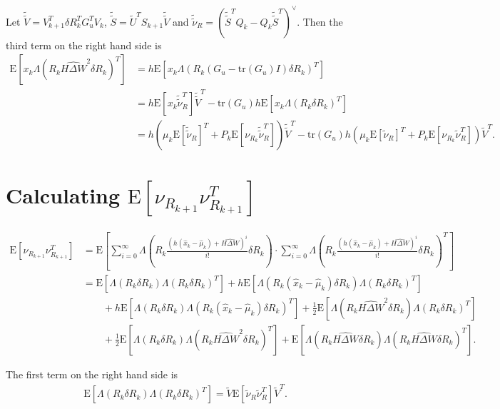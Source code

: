 \documentclass[10pt]{article}
\newcommand{\tr}[1]{\ensuremath{\mathrm{tr}\left( #1 \right)}}
\newcommand{\expect}[1]{\ensuremath{\mathrm{E}\left[ #1 \right]}}
\begin{document}
\noindent Let $\tilde{\tilde{V}} = V_{k+1}^T\delta R_k^TG_u^TV_k$, $\tilde{\tilde{S}} = \tilde{U}^TS_{k+1}\tilde{\tilde{V}}$ and $\tilde{\tilde{\nu}}_R = (\tilde{\tilde{S}}^TQ_k-Q_k\tilde{\tilde{S}}^T)^\vee$.
Then the third term on the right hand side is
\begin{align*}
	\expect{x_k\Lambda(R_k\widehat{H\Delta W}^2\delta R_k)^T} &= h\expect{x_k\Lambda(R_k(G_u-\tr{G_u}I)\delta R_k)^T} \\
	&= h\expect{x_k\tilde{\tilde{\nu}}_R^T}\tilde{\tilde{V}}^T - \tr{G_u}h\expect{x_k\Lambda(R_k\delta R_k)^T} \\
	&= h\left(\mu_k\expect{\tilde{\tilde{\nu}}_R}^T + P_k\expect{\nu_{R_k}\tilde{\tilde{\nu}}_R^T}\right)\tilde{\tilde{V}}^T - \tr{G_u}h\left(\mu_k\expect{\tilde{\nu}_R}^T + P_k\expect{\nu_{R_k}\tilde{\nu}_R^T}\right)\tilde{V}^T.
\end{align*}

\section{Calculating $\expect{\nu_{R_{k+1}}\nu_{R_{k+1}}^T}$}

\begin{align*}
	\expect{\nu_{R_{k+1}}\nu_{R_{k+1}}^T} &= \expect{\sum_{i=0}^\infty \Lambda\left(R_k \frac{\left(h(\hat{x}_k-\hat{\mu}_k) + \widehat{H\Delta W}\right)^i}{i!}\delta R_k\right) \cdot \sum_{i=0}^\infty \Lambda\left(R_k \frac{\left(h(\hat{x}_k-\hat{\mu}_k) + \widehat{H\Delta W}\right)^i}{i!}\delta R_k\right)^T} \\
	&= \expect{\Lambda(R_k\delta R_k)\Lambda(R_k\delta R_k)^T} + h\expect{\Lambda(R_k(\hat{x}_k-\hat{\mu}_k)\delta R_k)\Lambda(R_k\delta R_k)^T} \\
	&\qquad + h\expect{\Lambda(R_k\delta R_k)\Lambda(R_k(\hat{x}_k-\hat{\mu}_k)\delta R_k)^T} + \frac{1}{2}\expect{\Lambda(R_k\widehat{H\Delta W}^2\delta R_k)\Lambda(R_k\delta R_k)^T} \\
	&\qquad + \frac{1}{2}\expect{\Lambda(R_k\delta R_k)\Lambda(R_k\widehat{H\Delta W}^2\delta R_k)^T} + \expect{\Lambda(R_k\widehat{H\Delta W}\delta R_k)\Lambda(R_k\widehat{H\Delta W}\delta R_k)^T}.
\end{align*}

\noindent The first term on the right hand side is
\begin{align*}
	\expect{\Lambda(R_k\delta R_k)\Lambda(R_k\delta R_k)^T} = \tilde{V}\expect{\tilde{\nu}_R\tilde{\nu}_R^T}\tilde{V}^T.
\end{align*}
\end{document}
